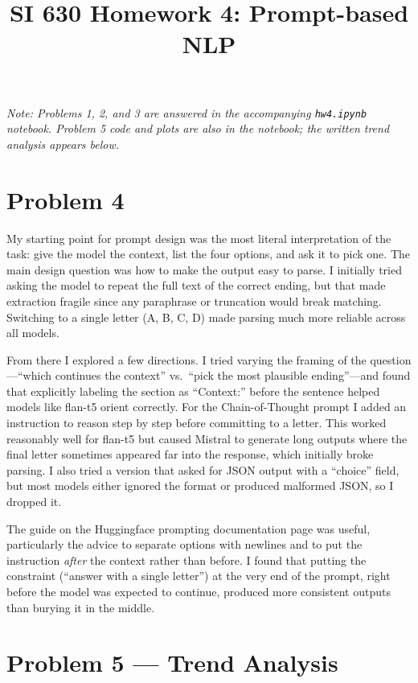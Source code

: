 \documentclass[11pt]{article}
\title{SI 630 Homework 4: Prompt-based NLP}
\author{}
\date{}
\begin{document}
\maketitle

\textit{Note: Problems 1, 2, and 3 are answered in the accompanying \texttt{hw4.ipynb} notebook. Problem 5 code and plots are also in the notebook; the written trend analysis appears below.}

\section*{Problem 4}

My starting point for prompt design was the most literal interpretation of the task: give the model the context, list the four options, and ask it to pick one. The main design question was how to make the output easy to parse. I initially tried asking the model to repeat the full text of the correct ending, but that made extraction fragile since any paraphrase or truncation would break matching. Switching to a single letter (A, B, C, D) made parsing much more reliable across all models.

From there I explored a few directions. I tried varying the framing of the question---``which continues the context'' vs.\ ``pick the most plausible ending''---and found that explicitly labeling the section as ``Context:'' before the sentence helped models like flan-t5 orient correctly. For the Chain-of-Thought prompt I added an instruction to reason step by step before committing to a letter. This worked reasonably well for flan-t5 but caused Mistral to generate long outputs where the final letter sometimes appeared far into the response, which initially broke parsing. I also tried a version that asked for JSON output with a ``choice'' field, but most models either ignored the format or produced malformed JSON, so I dropped it.

The guide on the Huggingface prompting documentation page was useful, particularly the advice to separate options with newlines and to put the instruction \textit{after} the context rather than before. I found that putting the constraint (``answer with a single letter'') at the very end of the prompt, right before the model was expected to continue, produced more consistent outputs than burying it in the middle.

\section*{Problem 5 --- Trend Analysis}
\end{document}

